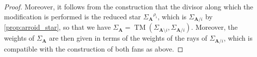 \documentclass[10pt,a4paper]{amsart}
\newcommand{\Star}[2]{{{#1}^{#2}}}
\newcommand{\arroid}{\mathbf{A}}
\newcommand{\arroidDeletion}[1]{\arroid\setminus #1}
\DeclareMathOperator{\tm}{TM}
\begin{document}
\begin{proof}
    Moreover, it follows from the construction that the divisor along which the modification is performed is the reduced star $\Star{\Sigma_\arroid}{\rho_i}$, which is $\Sigma_{\arroid/ i}$ by \cref{prop:arroid_star}, so that we have $\Sigma_\arroid = \tm(\Sigma_{\arroidDeletion{i}}, \Sigma_{\arroid / i})$. Moreover, the weights of $\Sigma_\arroid$ are then given in terms of the weights of the rays of $\Sigma_{\arroid / i}$, which is compatible with the construction of both fans as above.
\end{proof}
\end{document}
